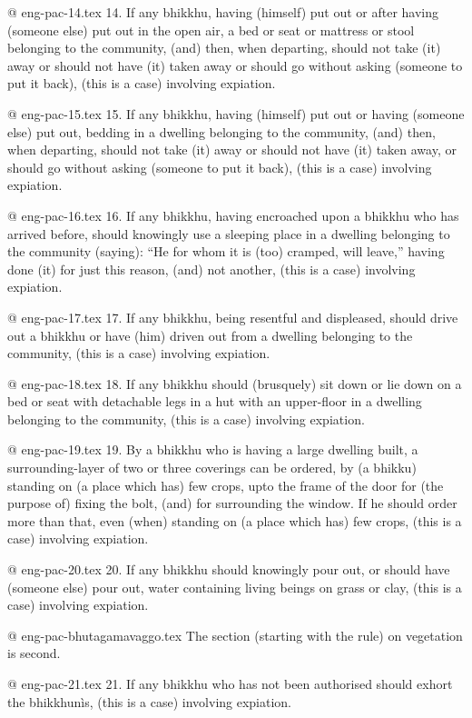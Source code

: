 @ eng-pac-14.tex
14. If any bhikkhu, having (himself) put out or after having (someone else) put out in the open air, a bed or seat or mattress or stool belonging to the community, (and) then, when departing, should not take (it) away or should not have (it) taken away or should go without asking (someone to put it back), (this is a case) involving expiation.

@ eng-pac-15.tex
15. If any bhikkhu, having (himself) put out or having (someone else) put out, bedding in a dwelling belonging to the community, (and) then, when departing, should not take (it) away or should not have (it) taken away, or should go without asking (someone to put it back), (this is a case) involving expiation.

@ eng-pac-16.tex
16. If any bhikkhu, having encroached upon a bhikkhu who has arrived before, should knowingly use a sleeping place in a dwelling belonging to the community (saying): “He for whom it is (too) cramped, will leave,” having done (it) for just this reason, (and) not another, (this is a case) involving expiation.

@ eng-pac-17.tex
17. If any bhikkhu, being resentful and displeased, should drive out a bhikkhu or have (him) driven out from a dwelling belonging to the community, (this is a case) involving expiation.

@ eng-pac-18.tex
18. If any bhikkhu should (brusquely) sit down or lie down on a bed or seat with detachable legs in a hut with an upper-floor in a dwelling belonging to the community, (this is a case) involving expiation.

@ eng-pac-19.tex
19. By a bhikkhu who is having a large dwelling built, a surrounding-layer of two or three coverings can be ordered, by (a bhikku) standing on (a place which has) few crops, upto the frame of the door for (the purpose of) fixing the bolt, (and) for surrounding the window. If he should order more than that, even (when) standing on (a place which has) few crops, (this is a case) involving expiation.

@ eng-pac-20.tex
20. If any bhikkhu should knowingly pour out, or should have (someone else) pour out, water containing living beings on grass or clay, (this is a case) involving expiation.

@ eng-pac-bhutagamavaggo.tex
The section (starting with the rule) on vegetation is second.

@ eng-pac-21.tex
21. If any bhikkhu who has not been authorised should exhort the bhikkhunìs, (this is a case) involving expiation.

